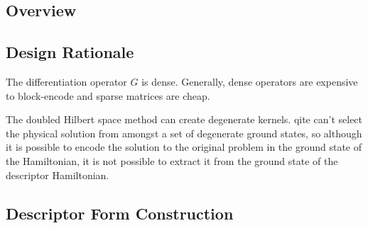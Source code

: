 %

\subsection{Overview}

\subsection{Design Rationale}
The differentiation operator $G$ is dense. Generally, dense operators are expensive to block-encode and sparse matrices are cheap.


The doubled Hilbert space method can create degenerate kernels. \Gls{qite} can't select the physical solution from amongst a set of degenerate ground states, so although it is possible to encode the solution to the original problem in the ground state of the Hamiltonian, it is not possible to extract it from the ground state of the descriptor Hamiltonian.

\subsection{Descriptor Form Construction}
\label{sec:descriptor-construction}

